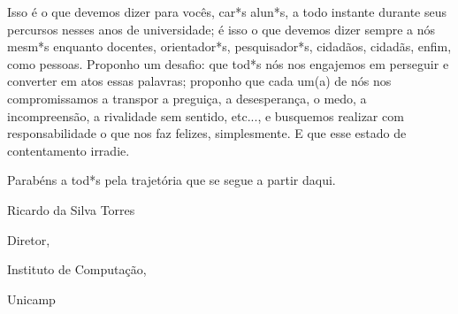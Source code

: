 Isso é o que devemos dizer para vocês, car*s alun*s, a todo instante durante
seus percursos nesses anos de universidade; é isso o que devemos dizer sempre a
nós mesm*s enquanto docentes, orientador*s, pesquisador*s, cidadãos, cidadãs, enfim, como
pessoas. Proponho um desafio: que tod*s nós nos engajemos em perseguir e
converter em atos essas palavras; proponho que cada um(a) de nós nos compromissamos
a transpor a preguiça, a desesperança, o medo, a incompreensão, a rivalidade sem
sentido, etc..., e busquemos realizar com responsabilidade o que nos faz
felizes, simplesmente. E que esse estado de contentamento irradie.

Parabéns a tod*s pela trajetória que se segue a partir daqui.

Ricardo da Silva Torres

Diretor,

Instituto de Computação,

Unicamp
